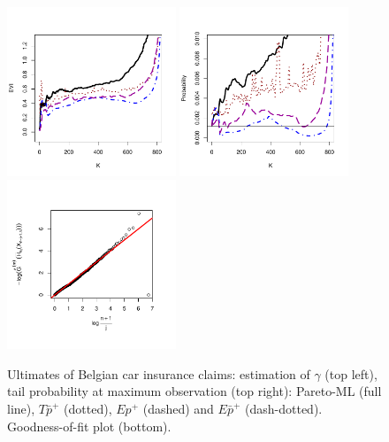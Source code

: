 \begin{figure}[!ht]
 \centering
\includegraphics[width=0.45\textwidth]{./plots/paper3/ultimates_evi.pdf} 
\includegraphics[width=0.45\textwidth]{./plots/paper3/ultimates_tail.pdf} \\
\includegraphics[width=0.45\textwidth]{./plots/paper3/ultimates_GoF.pdf}
 
 \caption{Ultimates of Belgian car insurance claims: estimation of $\gamma$ (top left), tail probability at maximum observation (top right): Pareto-ML (full line), $T\bar{p}^+$ (dotted), $Ep^+$ (dashed) and $E\bar{p}^+$ (dash-dotted). Goodness-of-fit plot (bottom).}
\label{paper3:fig10}
\end{figure} 

